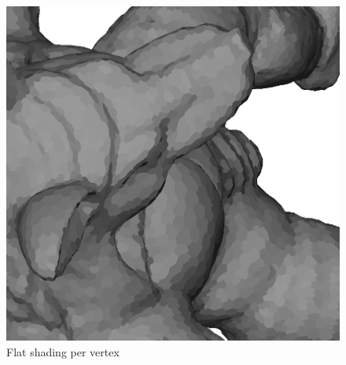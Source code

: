 \begin{figure}[!h]
    \endminipage\hfill
    \centering
    \includegraphics[scale=0.3]{images/armadillo-extendfs-2.png}
    \endminipage
    \caption{Flat shading per vertex}
\end{figure}


